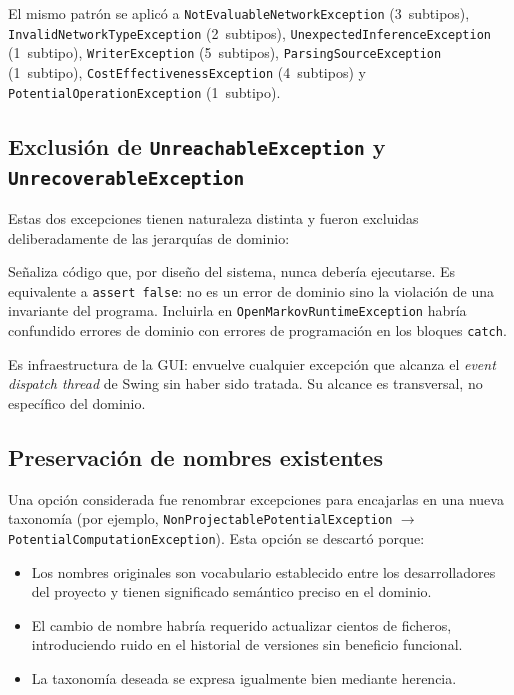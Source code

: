\documentclass[12pt,a4paper]{article}
\begin{document}
El mismo patrón se aplicó a \texttt{NotEvaluableNetworkException} (3~subtipos),
\texttt{InvalidNetworkTypeException} (2~subtipos),
\texttt{UnexpectedInferenceException} (1~subtipo), \texttt{WriterException}
(5~subtipos), \texttt{ParsingSourceException} (1~subtipo),
\texttt{CostEffectivenessException} (4~subtipos) y
\texttt{PotentialOperationException} (1~subtipo).

\subsection{Exclusión de \texttt{UnreachableException} y
  \texttt{UnrecoverableException}}
\label{sec:exclusion}

Estas dos excepciones tienen naturaleza distinta y fueron excluidas
deliberadamente de las jerarquías de dominio:

\begin{description}[leftmargin=2em]
  \item[\texttt{UnreachableException}] Señaliza código que, por diseño del
    sistema, nunca debería ejecutarse. Es equivalente a \texttt{assert false}:
    no es un error de dominio sino la violación de una invariante del programa.
    Incluirla en \texttt{OpenMarkovRuntimeException} habría confundido errores
    de dominio con errores de programación en los bloques \texttt{catch}.
  \item[\texttt{UnrecoverableException}] Es infraestructura de la GUI: envuelve
    cualquier excepción que alcanza el \textit{event dispatch thread} de Swing
    sin haber sido tratada. Su alcance es transversal, no específico del dominio.
\end{description}

\subsection{Preservación de nombres existentes}
\label{sec:nombres}

Una opción considerada fue renombrar excepciones para encajarlas en una nueva
taxonomía (por ejemplo, \texttt{NonProjectablePotentialException}
$\to$ \texttt{PotentialComputationException}). Esta opción se descartó porque:

\begin{itemize}
  \item Los nombres originales son vocabulario establecido entre los
    desarrolladores del proyecto y tienen significado semántico preciso en el
    dominio.
  \item El cambio de nombre habría requerido actualizar cientos de ficheros,
    introduciendo ruido en el historial de versiones sin beneficio funcional.
  \item La taxonomía deseada se expresa igualmente bien mediante herencia.
\end{itemize}
\end{document}
